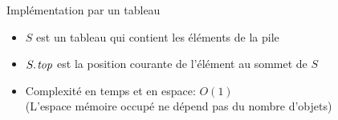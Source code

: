 \begin{frame}{Implémentation par un tableau}

\begin{itemize}
\item $S$ est un tableau qui contient les éléments de la pile
\item $\attrib{S}{top}$ est la position courante de l'élément au sommet de $S$

\medskip

    \begin{center}
      \begin{small}

      \bigskip
      \hfill
      \end{small}
    \end{center}
\item Complexité en temps \alert{et en espace}: $O(1)$\\
(L'espace mémoire occupé ne dépend pas du nombre d'objets)
\end{itemize}

\end{frame}

